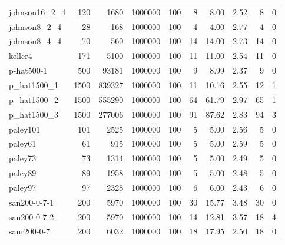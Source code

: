 \begin{tabular}{lrrrrrrrrr}
johnson16\_2\_4 & 120 & 1680 & 1000000 & 100 & 8 & 8.00 & 2.52 & 8 & 0 \\
johnson8\_2\_4 & 28 & 168 & 1000000 & 100 & 4 & 4.00 & 2.77 & 4 & 0 \\
johnson8\_4\_4 & 70 & 560 & 1000000 & 100 & 14 & 14.00 & 2.73 & 14 & 0 \\
keller4 & 171 & 5100 & 1000000 & 100 & 11 & 11.00 & 2.54 & 11 & 0 \\
p-hat500-1 & 500 & 93181 & 1000000 & 100 & 9 & 8.99 & 2.37 & 9 & 0 \\
p\_hat1500\_1 & 1500 & 839327 & 1000000 & 100 & 11 & 10.16 & 2.55 & 12 & 1 \\
p\_hat1500\_2 & 1500 & 555290 & 1000000 & 100 & 64 & 61.79 & 2.97 & 65 & 1 \\
p\_hat1500\_3 & 1500 & 277006 & 1000000 & 100 & 91 & 87.62 & 2.83 & 94 & 3 \\
paley101 & 101 & 2525 & 1000000 & 100 & 5 & 5.00 & 2.56 & 5 & 0 \\
paley61 & 61 & 915 & 1000000 & 100 & 5 & 5.00 & 2.59 & 5 & 0 \\
paley73 & 73 & 1314 & 1000000 & 100 & 5 & 5.00 & 2.49 & 5 & 0 \\
paley89 & 89 & 1958 & 1000000 & 100 & 5 & 5.00 & 2.48 & 5 & 0 \\
paley97 & 97 & 2328 & 1000000 & 100 & 6 & 6.00 & 2.43 & 6 & 0 \\
san200-0-7-1 & 200 & 5970 & 1000000 & 100 & 30 & 15.77 & 3.48 & 30 & 0 \\
san200-0-7-2 & 200 & 5970 & 1000000 & 100 & 14 & 12.81 & 3.57 & 18 & 4 \\
sanr200-0-7 & 200 & 6032 & 1000000 & 100 & 18 & 17.95 & 2.50 & 18 & 0 \\
\bottomrule
\end{tabular}
